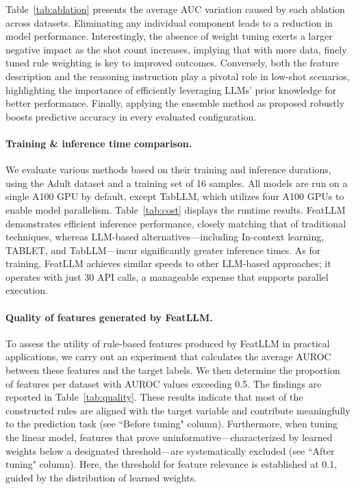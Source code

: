 Table~\ref{tab:ablation} presents the average AUC variation caused by each ablation across datasets. Eliminating any individual component leads to a reduction in model performance. Interestingly, the absence of weight tuning exerts a larger negative impact as the shot count increases, implying that with more data, finely tuned rule weighting is key to improved outcomes. Conversely, both the feature description and the reasoning instruction play a pivotal role in low-shot scenarios, highlighting the importance of efficiently leveraging LLMs' prior knowledge for better performance. Finally, applying the ensemble method as proposed robustly boosts predictive accuracy in every evaluated configuration.

\vspace*{-0.12in}
\paragraph{Training \& inference time comparison.} We evaluate various methods based on their training and inference durations, using the Adult dataset and a training set of 16 samples. All models are run on a single A100 GPU by default, except TabLLM, which utilizes four A100 GPUs to enable model parallelism. Table~\ref{tab:cost} displays the runtime results. \textsf{FeatLLM} demonstrates efficient inference performance, closely matching that of traditional techniques, whereas LLM-based alternatives—including In-context learning, TABLET, and TabLLM—incur significantly greater inference times. As for training, \textsf{FeatLLM} achieves similar speeds to other LLM-based approaches; it operates with just 30 API calls, a manageable expense that supports parallel execution.

\vspace*{-0.12in}
\paragraph{Quality of features generated by \textsf{FeatLLM}.}
To assess the utility of rule-based features produced by \textsf{FeatLLM} in practical applications, we carry out an experiment that calculates the average AUROC between these features and the target labels. We then determine the proportion of features per dataset with AUROC values exceeding 0.5. The findings are reported in Table~\ref{tab:quality}. These results indicate that most of the constructed rules are aligned with the target variable and contribute meaningfully to the prediction task (see ``Before tuning" column). Furthermore, when tuning the linear model, features that prove uninformative—characterized by learned weights below a designated threshold—are systematically excluded (see ``After tuning" column). Here, the threshold for feature relevance is established at 0.1, guided by the distribution of learned weights.

